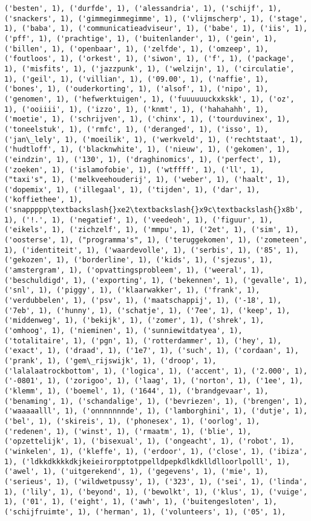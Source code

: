 \documentclass{article}
\begin{document}
\begin{Verbatim}[commandchars=\\\{\}]
('besten', 1), ('durfde', 1), ('alessandria', 1), ('schijf', 1), ('snackers', 1), ('gimmegimmegimme', 1), ('vlijmscherp', 1), ('stage', 1), ('baba', 1), ('communicatieadviseur', 1), ('babe', 1), ('iis', 1), ('pff', 1), ('prachtige', 1), ('buitenlander', 1), ('gein', 1), ('billen', 1), ('openbaar', 1), ('zelfde', 1), ('omzeep', 1), ('foutloos', 1), ('orkest', 1), ('siwon', 1), ('f', 1), ('package', 1), ('misfits', 1), ('jazzpunk', 1), ('welzijn', 1), ('circulatie', 1), ('geil', 1), ('villian', 1), ('09.00', 1), ('naffie', 1), ('bones', 1), ('ouderkorting', 1), ('alsof', 1), ('nipo', 1), ('genomen', 1), ('hefwerktuigen', 1), ('fuuuuuuckxkskk', 1), ('oz', 1), ('ooiiii', 1), ('izzo', 1), ('knmt', 1), ('hahahahh', 1), ('moetie', 1), ('schrijven', 1), ('chinx', 1), ('tourduvinex', 1), ('toneelstuk', 1), ('rmfc', 1), ('deranged', 1), ('isso', 1), ('jan\_lely', 1), ('moeilik', 1), ('werkveld', 1), ('rechtstaat', 1), ('hudtloff', 1), ('blacknwhite', 1), ('nieuw', 1), ('gekomen', 1), ('eindzin', 1), ('130', 1), ('draghinomics', 1), ('perfect', 1), ('zoeken', 1), ('islamofobie', 1), ('wtffff', 1), ('ll', 1), ("taxi's", 1), ('melkveehouderij', 1), ('weber', 1), ('haalt', 1), ('dopemix', 1), ('illegaal', 1), ('tijden', 1), ('dar', 1), ('koffiethee', 1), ('snappppp\textbackslash{}xe2\textbackslash{}x9c\textbackslash{}x8b', 1), ('!.', 1), ('negatief', 1), ('veedeoh', 1), ('figuur', 1), ('eikels', 1), ('zichzelf', 1), ('mmpu', 1), ('2et', 1), ('sim', 1), ('oosterse', 1), ("programma's", 1), ('teruggekomen', 1), ('zometeen', 1), ('identiteit', 1), ('waardevolle', 1), ('serbis', 1), ('85', 1), ('gekozen', 1), ('borderline', 1), ('kids', 1), ('sjezus', 1), ('amstergram', 1), ('opvattingsprobleem', 1), ('weeral', 1), ('beschuldigd', 1), ('exporting', 1), ('bekennen', 1), ('gevalle', 1), ('snl', 1), ('piggy', 1), ('klaarwakker', 1), ('frank', 1), ('verdubbelen', 1), ('psv', 1), ('maatschappij', 1), ('-18', 1), ('7eb', 1), ('hunny', 1), ('schatje', 1), ('7ee', 1), ('keep', 1), ('middenweg', 1), ('bekijk', 1), ('zomer', 1), ('shrek', 1), ('omhoog', 1), ('nieminen', 1), ('sunniewitdatyea', 1), ('totalitaire', 1), ('pgn', 1), ('rotterdammer', 1), ('hey', 1), ('exact', 1), ('draad', 1), ('1e7', 1), ('such', 1), ('cordaan', 1), ('prank', 1), ('gem\_rijswijk', 1), ('droop', 1), ('lalalaatrockbottom', 1), ('logica', 1), ('accent', 1), ('2.000', 1), ('-0801', 1), ('zorigoo', 1), ('laag', 1), ('norton', 1), ('1ee', 1), ('klemm', 1), ('boemel', 1), ('1644', 1), ('brandgevaar', 1), ('benaming', 1), ('schandalige', 1), ('bevriezen', 1), ('brengen', 1), ('waaaaalll', 1), ('onnnnnnnde', 1), ('lamborghini', 1), ('dutje', 1), ('bel', 1), ('skireis', 1), ('phonesex', 1), ('oorlog', 1), ('redenen', 1), ('winst', 1), ('rmaatm', 1), ('blie', 1), ('opzettelijk', 1), ('bisexual', 1), ('ongeacht', 1), ('robot', 1), ('winkelen', 1), ('kleffe', 1), ('erdoor', 1), ('close', 1), ('ibiza', 1), ('ldkkdkkkkdkjkeieirorpptotppelldpepkdlkdklldlloorlpolll', 1), ('awel', 1), ('uitgerekend', 1), ('gegevens', 1), ('mie', 1), ('serieus', 1), ('wildwetpussy', 1), ('323', 1), ('sei', 1), ('linda', 1), ('lily', 1), ('beyond', 1), ('bewolkt', 1), ('klus', 1), ('vuige', 1), ('01', 1), ('eight', 1), ('awh', 1), ('buitengesloten', 1), ('schijfruimte', 1), ('herman', 1), ('volunteers', 1), ('05', 1), 
\end{Verbatim}
\end{document}
